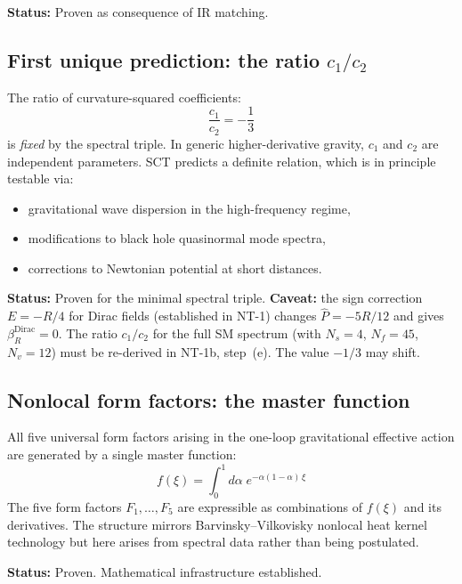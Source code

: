 \documentclass[12pt,a4paper]{article}
\begin{document}
\textbf{Status:} Proven as consequence of IR matching.

\subsection{First unique prediction: the ratio $c_1/c_2$}

The ratio of curvature-squared coefficients:
\begin{equation}\label{eq:ratio}
  \frac{c_1}{c_2} = -\frac{1}{3}
\end{equation}
is \emph{fixed} by the spectral triple. In generic higher-derivative gravity,
$c_1$ and $c_2$ are independent parameters. SCT predicts a definite relation,
which is in principle testable via:
\begin{itemize}
  \item gravitational wave dispersion in the high-frequency regime,
  \item modifications to black hole quasinormal mode spectra,
  \item corrections to Newtonian potential at short distances.
\end{itemize}

\textbf{Status:} Proven for the minimal spectral triple.
\textbf{Caveat:} the sign correction $E = -R/4$ for Dirac fields
(established in NT-1) changes $\hat{P} = -5R/12$ and gives
$\beta_R^{\text{Dirac}} = 0$. The ratio $c_1/c_2$ for the full
SM spectrum (with $N_s = 4$, $N_f = 45$, $N_v = 12$) must be
re-derived in NT-1b, step~(e). The value $-1/3$ may shift.

\subsection{Nonlocal form factors: the master function}

All five universal form factors arising in the one-loop gravitational effective action
are generated by a single master function:
\begin{equation}\label{eq:master}
  f(\xi) = \int_0^1 d\alpha\; e^{-\alpha(1-\alpha)\,\xi}
\end{equation}
The five form factors $F_1,\ldots,F_5$ are expressible as combinations of $f(\xi)$
and its derivatives. The structure mirrors Barvinsky--Vilkovisky nonlocal heat kernel
technology but here arises from spectral data rather than being postulated.

\textbf{Status:} Proven. Mathematical infrastructure established.

\end{document}
